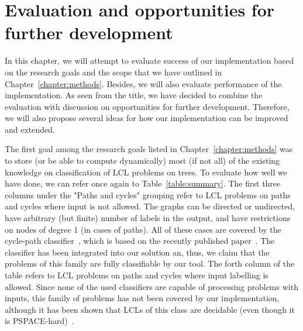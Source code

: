 \chapter{Evaluation and opportunities for further development}
\label{chapter:evaluation}

In this chapter, we will attempt to evaluate success of our implementation
based on the research goals and the scope that we have outlined in Chapter~\ref{chapter:methods}.
Besides, we will also evaluate performance of the implementation. As seen from the title,
we have decided to combine the evaluation with discussion on opportunities for further
development. Therefore, we will also propose several ideas for how our implementation
can be improved and extended.

The first goal among the research goals listed in Chapter~\ref{chapter:methods}
was to store (or be able to compute dynamically) most
(if not all) of the existing knowledge on classification of LCL problems on trees.
To evaluate how well we have done, we can refer once again to Table~\ref{table:summary}.
The first three columns under the "Paths and cycles" grouping refer to LCL problems on
paths and cycles where input is not allowed. The graphs can be directed or undirected,
have arbitrary (but finite) number of labels in the output, and have restrictions
on nodes of degree 1 (in cases of paths). All of these cases are covered by
the cycle-path classifier~\cite{FIXME}, which is based on the recently
published paper~\cite{FIXME}. The classifier has been integrated into our
solution an, thus, we claim that the problems of this family are fully classifiable by our tool.
The forth column of the table refers to LCL problems on paths and cycles
where input labelling is allowed. Since none of the used classifiers
are capable of processing problems with inputs, this family of problems
has not been covered by our implementation, although it has been shown that
LCLs of this class are decidable (even though it is PSPACE-hard)~\cite{Balliu2018}.

